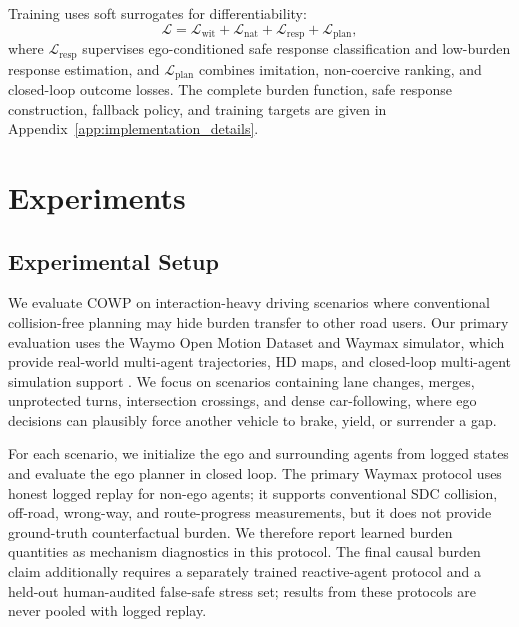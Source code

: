 \documentclass[10pt]{article}
\begin{document}
Training uses soft surrogates for differentiability:
\begin{equation}
    \mathcal{L}
    =
    \mathcal{L}_{\mathrm{wit}}
    +
    \mathcal{L}_{\mathrm{nat}}
    +
    \mathcal{L}_{\mathrm{resp}}
    +
    \mathcal{L}_{\mathrm{plan}},
\end{equation}
where $\mathcal{L}_{\mathrm{resp}}$ supervises ego-conditioned safe response classification and low-burden response estimation, and $\mathcal{L}_{\mathrm{plan}}$ combines imitation, non-coercive ranking, and closed-loop outcome losses. The complete burden function, safe response construction, fallback policy, and training targets are given in Appendix~\ref{app:implementation_details}.



\section{Experiments}
\label{sec:experiments}

\subsection{Experimental Setup}
\label{sec:exp_setup}

We evaluate COWP on interaction-heavy driving scenarios where conventional collision-free planning may hide burden transfer to other road users. Our primary evaluation uses the Waymo Open Motion Dataset and Waymax simulator, which provide real-world multi-agent trajectories, HD maps, and closed-loop multi-agent simulation support \cite{ettinger2021large, gulino2023waymax}. We focus on scenarios containing lane changes, merges, unprotected turns, intersection crossings, and dense car-following, where ego decisions can plausibly force another vehicle to brake, yield, or surrender a gap.

For each scenario, we initialize the ego and surrounding agents from logged states and evaluate the ego planner in closed loop. The primary Waymax protocol uses honest logged replay for non-ego agents; it supports conventional SDC collision, off-road, wrong-way, and route-progress measurements, but it does not provide ground-truth counterfactual burden. We therefore report learned burden quantities as mechanism diagnostics in this protocol. The final causal burden claim additionally requires a separately trained reactive-agent protocol and a held-out human-audited false-safe stress set; results from these protocols are never pooled with logged replay.
\end{document}

